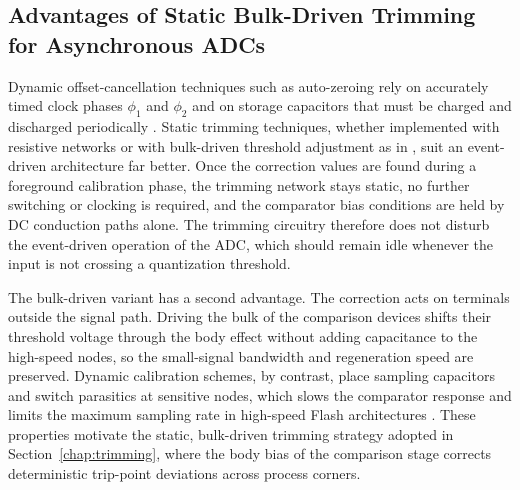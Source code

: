 \subsection{Advantages of Static Bulk-Driven Trimming for Asynchronous ADCs}
\label{subsec:static_trimming}
Dynamic offset-cancellation techniques such as auto-zeroing rely on accurately timed clock phases $\phi_1$ and $\phi_2$ and on storage capacitors that must be charged and discharged periodically \cite{baker_cmos_2010}. Static trimming techniques, whether implemented with resistive networks or with bulk-driven threshold adjustment as in \cite{yao_bulk_2011}, suit an event-driven architecture far better. Once the correction values are found during a foreground calibration phase, the trimming network stays static, no further switching or clocking is required, and the comparator bias conditions are held by DC conduction paths alone. The trimming circuitry therefore does not disturb the event-driven operation of the ADC, which should remain idle whenever the input is not crossing a quantization threshold.

The bulk-driven variant has a second advantage. The correction acts on terminals outside the signal path. Driving the bulk of the comparison devices shifts their threshold voltage through the body effect without adding capacitance to the high-speed nodes, so the small-signal bandwidth and regeneration speed are preserved. Dynamic calibration schemes, by contrast, place sampling capacitors and switch parasitics at sensitive nodes, which slows the comparator response and limits the maximum sampling rate in high-speed Flash architectures \cite{baker_cmos_2010}. These properties motivate the static, bulk-driven trimming strategy adopted in Section~\ref{chap:trimming}, where the body bias of the comparison stage corrects deterministic trip-point deviations across process corners.
\newpage


